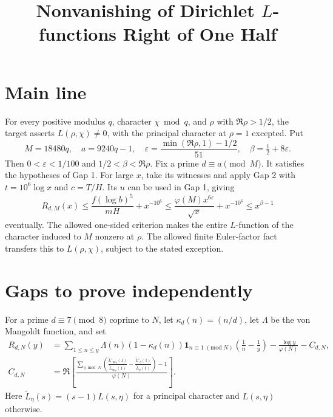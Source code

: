 \documentclass{article}
\begin{document}
\title{Nonvanishing of Dirichlet \(L\)-functions Right of One Half}
\author{}
\date{}
\maketitle

\section*{Main line}
For every positive modulus \(q\), character \(\chi\bmod q\), and \(\rho\) with \(\Re\rho>1/2\), the target asserts \(L(\rho,\chi)\ne0\), with the principal character at \(\rho=1\) excepted. Put
\[
 M=18480q,\quad a=9240q-1,\quad
 \varepsilon=\frac{\min(\Re\rho,1)-1/2}{51},\quad
 \beta=\tfrac12+8\varepsilon.
\]
Then \(0<\varepsilon<1/100\) and \(1/2<\beta<\Re\rho\). Fix a prime \(d\equiv a\pmod M\). It satisfies the hypotheses of Gap 1. For large \(x\), take its witnesses and apply Gap 2 with \(t=10^6\log x\) and \(c=T/H\). Its \(u\) can be used in Gap 1, giving
\[
 R_{d,M}(x)\le
 \frac{f(\log b)^5}{mH}+x^{-10^6}
 \le \frac{\varphi(M)x^{6\varepsilon}}{\sqrt{x}}+x^{-10^6}
 \le x^{\beta-1}
\]
eventually. The allowed one-sided criterion makes the entire \(L\)-function of the character induced to \(M\) nonzero at \(\rho\). The allowed finite Euler-factor fact transfers this to \(L(\rho,\chi)\), subject to the stated exception.

\section*{Gaps to prove independently}
For a prime \(d\equiv7\pmod8\) coprime to \(N\), let \(\kappa_d(n)=(n/d)\), let \(\Lambda\) be the von Mangoldt function, and set
\[
\begin{split}
 R_{d,N}(y)
 &=\sum_{1\le n\le y}\Lambda(n)(1-\kappa_d(n))
   \mathbf1_{n\equiv1\;(\mathrm{mod}\;N)}
   \left(\frac1n-\frac1y\right)
   -\frac{\log y}{\varphi(N)}-C_{d,N},\\
 C_{d,N}
 &=\Re\!\left[
 \frac{\displaystyle\sum_{\eta\bmod N}
 \left(\frac{\widetilde L'_{\eta\kappa_d}(1)}
 {\widetilde L_{\eta\kappa_d}(1)}
 -\frac{\widetilde L'_\eta(1)}{\widetilde L_\eta(1)}\right)-1}
 {\varphi(N)}\right].
\end{split}
\]
Here \(\widetilde L_\eta(s)=(s-1)L(s,\eta)\) for a principal character and \(L(s,\eta)\) otherwise.
\end{document}

